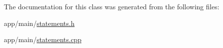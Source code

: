 The documentation for this class was generated from the following files\+:\begin{DoxyCompactItemize}
\item 
app/main/\hyperlink{statements_8h}{statements.\+h}\item 
app/main/\hyperlink{statements_8cpp}{statements.\+cpp}\end{DoxyCompactItemize}
